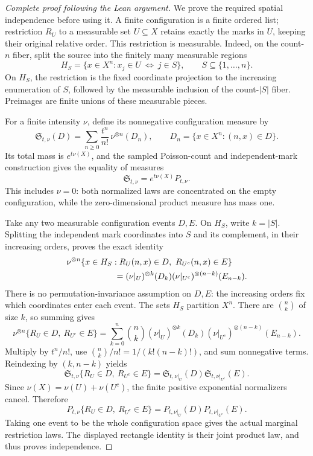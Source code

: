 \begin{proof}[Complete proof following the Lean argument]
We prove the required spatial independence before using it.
A finite configuration is a finite ordered list; restriction \(R_U\) to a
measurable set \(U\subseteq X\) retains exactly the marks in \(U\),
keeping their original relative order. This restriction is measurable.
Indeed, on the count-\(n\) fiber, split the source into the finitely many
measurable regions
\[
       H_S=\{x\in X^n:x_j\in U\ \Longleftrightarrow\ j\in S\},
                  \qquad S\subseteq\{1,\ldots,n\}.
\]
On \(H_S\), the restriction is the fixed coordinate projection to the
increasing enumeration of \(S\), followed by the measurable inclusion
of the count-\(|S|\) fiber. Preimages are finite unions of these
measurable pieces.

For a finite intensity \(\nu\), define its nonnegative configuration
measure by
\[
 \mathfrak S_{t,\nu}(D)
   =\sum_{n\ge0}\frac{t^n}{n!}\,
     \nu^{\otimes n}(D_n),
 \qquad
 D_n=\{x\in X^n:(n,x)\in D\}.
\]
Its total mass is \(e^{t\nu(X)}\), and the sampled Poisson-count and
independent-mark construction gives the equality of measures
\[
         \mathfrak S_{t,\nu}=e^{t\nu(X)}P_{t,\nu}.
\]
This includes \(\nu=0\): both normalized laws are concentrated on the
empty configuration, while the zero-dimensional product measure has
mass one.

Take any two measurable configuration events \(D,E\). On \(H_S\),
write \(k=|S|\). Splitting the independent mark coordinates into \(S\)
and its complement, in their increasing orders, proves the exact identity
\[
\begin{aligned}
 &\nu^{\otimes n}
   \{x\in H_S:R_U(n,x)\in D,\ R_{U^c}(n,x)\in E\}\\
 &\hspace{20mm}
 = (\nu|_U)^{\otimes k}(D_k)
       (\nu|_{U^c})^{\otimes(n-k)}(E_{n-k}).
\end{aligned}
\]
There is no permutation-invariance assumption on \(D,E\): the increasing
orders fix which coordinates enter each event. The sets \(H_S\) partition
\(X^n\). There are \(\binom nk\) of size \(k\), so summing gives
\[
 \nu^{\otimes n}\{R_U\in D,\ R_{U^c}\in E\}
 =\sum_{k=0}^n\binom nk
       (\nu|_U)^{\otimes k}(D_k)
       (\nu|_{U^c})^{\otimes(n-k)}(E_{n-k}).
\]
Multiply by \(t^n/n!\), use
\(\binom nk/n!=1/(k!(n-k)!)\), and sum nonnegative terms. Reindexing
by \((k,n-k)\) yields
\[
 \mathfrak S_{t,\nu}\{R_U\in D,\ R_{U^c}\in E\}
     =\mathfrak S_{t,\nu|_U}(D)
        \mathfrak S_{t,\nu|_{U^c}}(E).
\]
Since \(\nu(X)=\nu(U)+\nu(U^c)\), the finite positive exponential
normalizers cancel. Therefore
\[
 P_{t,\nu}\{R_U\in D,\ R_{U^c}\in E\}
       =P_{t,\nu|_U}(D)P_{t,\nu|_{U^c}}(E).
\]
Taking one event to be the whole configuration space gives the actual
marginal restriction laws. The displayed rectangle identity is their
joint product law, and thus proves independence.


\end{proof}
